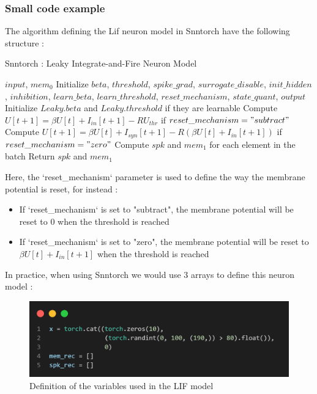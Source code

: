 \documentclass[11pt]{article}
\begin{document}
\subsubsection*{Small code example}
The algorithm defining the Lif neuron model in Snntorch have the following structure :
\begin{algorithm}[H]
  \caption{Snntorch : Leaky Integrate-and-Fire Neuron Model}
  \begin{algorithmic}[1]
    \Require $input$, $mem_0$
    \State Initialize $beta$, $threshold$, $spike\_grad$, $surrogate\_disable$, $init\_hidden$, $inhibition$, $learn\_beta$, $learn\_threshold$, $reset\_mechanism$, $state\_quant$, $output$
    \State Initialize $Leaky.beta$ and $Leaky.threshold$ if they are learnable
    \EndIf
    \State Compute $U[t+1] = \beta U[t] + I_{in}[t+1] - RU_{thr}$ if $reset\_mechanism = "subtract"$
    \State Compute $U[t+1] = \beta U[t] + I_{syn}[t+1] - R(\beta U[t] + I_{in}[t+1])$ if $reset\_mechanism = "zero"$
    \State Compute $spk$ and $mem_1$ for each element in the batch
    \State Return $spk$ and $mem_1$
    \EndFor
  \end{algorithmic}
\end{algorithm}

Here, the `reset\_mechanism` parameter is used to define the way the membrane potential is reset, for instead :
\begin{itemize}
  \item If `reset\_mechanism` is set to "subtract", the membrane potential will be reset to $0$ when the threshold is reached
  \item If `reset\_mechanism` is set to "zero", the membrane potential will be reset to $\beta U[t] + I_{in}[t+1]$ when the threshold is reached
\end{itemize}

In practice, when using Snntorch we would use 3 arrays to define this neuron model :

\begin{figure}[H]
  \begin{center}
    \includegraphics[width=\textwidth]{image/def_vars.png}
    \caption{Definition of the variables used in the LIF model}
    \label{fig:def_vars}
  \end{center}
\end{figure}
\end{document}
